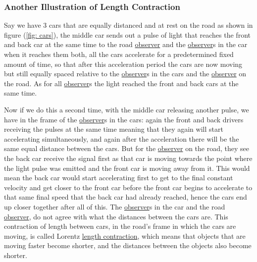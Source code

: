 \subsubsection{Another Illustration of Length Contraction}

Say we have 3 cars that are equally distanced and at rest on the road as shown in figure (\ref{fig: cars}), the middle car sends out a pulse of light that reaches the front and back car at the same time to the road \hyperlink{def-observer}{observer} and the \hyperlink{def-observer}{observer}s in the car when it reaches them both, all the cars accelerate for a predetermined fixed amount of time, so that after this acceleration period the cars are now moving but still equally spaced relative to the \hyperlink{def-observer}{observer}s in the cars and the \hyperlink{def-observer}{observer} on the road. As for all \hyperlink{def-observer}{observer}s the light reached the front and back cars at the same time.

Now if we do this a second time, with the middle car releasing another pulse, we have in the frame of the \hyperlink{def-observer}{observer}s in the cars: again the front and back drivers receiving the pulses at the same time meaning that they again will start accelerating simultaneously, and again after the acceleration there will be the same equal distance between the cars. But for the \hyperlink{def-observer}{observer} on the road, they see the back car receive the signal first as that car is moving towards the point where the light pulse was emitted and the front car is moving away from it. This would mean the back car would start accelerating first to get to the final constant velocity and get closer to the front car before the front car begins to accelerate to that same final speed that the back car had already reached, hence the cars end up closer together after all of this. The \hyperlink{def-observer}{observer}s in the car and the road \hyperlink{def-observer}{observer}, do not agree with what the distances between the cars are. This contraction of length between cars, in the road's frame in which the cars are moving, is called Lorentz \hyperlink{def-length-contraction}{length contraction}, which means that objects that are moving faster become shorter, and the distances between the objects also become shorter.

